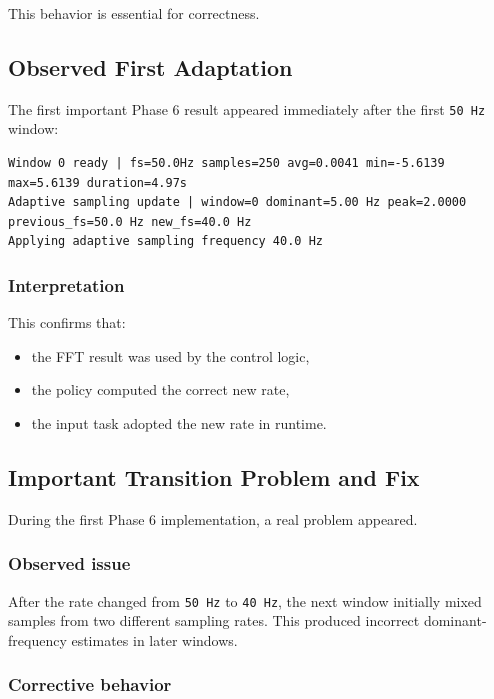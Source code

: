 \documentclass[12pt,a4paper]{article}
\begin{document}
This behavior is essential for correctness.

\subsection{Observed First Adaptation}

The first important Phase 6 result appeared immediately after the first
\texttt{50 Hz} window:

\begin{lstlisting}
Window 0 ready | fs=50.0Hz samples=250 avg=0.0041 min=-5.6139 max=5.6139 duration=4.97s
Adaptive sampling update | window=0 dominant=5.00 Hz peak=2.0000 previous_fs=50.0 Hz new_fs=40.0 Hz
Applying adaptive sampling frequency 40.0 Hz
\end{lstlisting}

\subsubsection*{Interpretation}

This confirms that:

\begin{itemize}
    \item the FFT result was used by the control logic,
    \item the policy computed the correct new rate,
    \item the input task adopted the new rate in runtime.
\end{itemize}

\subsection{Important Transition Problem and Fix}

During the first Phase 6 implementation, a real problem appeared.

\subsubsection*{Observed issue}

After the rate changed from \texttt{50 Hz} to \texttt{40 Hz}, the next window
initially mixed samples from two different sampling rates. This produced
incorrect dominant-frequency estimates in later windows.

\subsubsection*{Corrective behavior}
\end{document}
